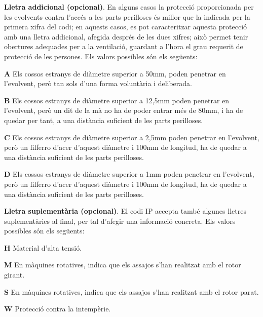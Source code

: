 \textbf{Lletra addicional (opcional)}. En alguns casos la protecci\'{o}
proporcionada per les evolvents contra l'acc\'{e}s a les parts
perilloses \'{e}s millor que la indicada per la primera xifra del codi;
en aquests casos, es pot caracteritzar aquesta protecci\'{o} amb una
lletra addicional, afegida despr\'{e}s de les dues xifres; aix\`{o} permet
tenir obertures adequades per a la ventilaci\'{o},  guardant a l'hora el
grau requerit de protecci\'{o} de les persones. Els valors possibles s\'{o}n
els seg\"{u}ents:
\begin{multicols}{2}
\begin{list}{}
   {\setlength{\labelwidth}{5mm} \setlength{\leftmargin}{5mm} \setlength{\labelsep}{2mm}}
   \item[\textbf{A}] Els  cossos estranys de di\`{a}metre superior a
   50\unit{mm},
    poden penetrar en l'evolvent, per\`{o} tan sols d'una forma volunt\`{a}ria i deliberada.
   \item[\textbf{B}] Els  cossos estranys de di\`{a}metre superior a 12,5\unit{mm}
    poden penetrar en l'evolvent, per\`{o} un dit de la m\`{a} no ha de poder entrar m\'{e}s de 80\unit{mm}, i
    ha de quedar per tant, a una dist\`{a}ncia    suficient de les parts perilloses.
   \item[\textbf{C}] Els  cossos estranys de di\`{a}metre superior a 2,5\unit{mm}
   poden penetrar en l'evolvent, per\`{o} un filferro d'acer d'aquest di\`{a}metre i 100\unit{mm}
   de longitud, ha de quedar a una dist\`{a}ncia suficient de les parts perilloses.
   \item[\textbf{D}] Els  cossos estranys de di\`{a}metre superior a 1\unit{mm}
   poden penetrar en l'evolvent, per\`{o} un filferro d'acer d'aquest di\`{a}metre i 100\unit{mm}
   de longitud, ha de quedar a una dist\`{a}ncia suficient de les parts perilloses.
\end{list}
\end{multicols}

\textbf{Lletra suplement\`{a}ria (opcional)}. El codi \textsf{IP} accepta tamb\'{e} algunes
lletres suplement\`{a}ries al final, per tal d'afegir una informaci\'{o} concreta. Els valors
possibles s\'{o}n els seg\"{u}ents:
\begin{multicols}{2}
\begin{list}{}
   {\setlength{\labelwidth}{6mm} \setlength{\leftmargin}{6mm} \setlength{\labelsep}{2mm}}
   \item[\textbf{H}] Material d'alta tensi\'{o}.
   \item[\textbf{M}] En m\`{a}quines rotatives, indica que els assajos s'han realitzat amb el
    rotor girant.
   \item[\textbf{S}] En m\`{a}quines rotatives, indica que els assajos s'han realitzat amb el
    rotor parat.
   \item[\textbf{W}] Protecci\'{o} contra la intemp\`{e}rie.
\end{list}
\end{multicols}

